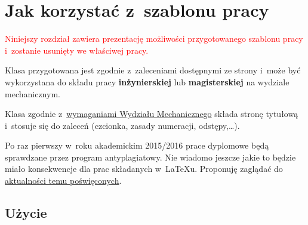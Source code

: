 
\chapter{Jak korzystać z~szablonu pracy}

\textcolor{red}{
    Niniejszy rozdział zawiera prezentację możliwości przygotowanego szablonu pracy
    i~zostanie usunięty we właściwej pracy.
}

Klasa przygotowana jest zgodnie z~zaleceniami dostępnymi ze strony \url{} i~może być wykorzystana do składu pracy \textbf{inżynierskiej} lub \textbf{magisterskiej} na wydziale mechanicznym.

Klasa zgodnie z~\href{http://www.wmech.pwr.wroc.pl/88428.dhtml}{wymaganiami Wydziału Mechanicznego} składa stronę tytułową i~stosuje się do zaleceń (czcionka, zasady numeracji, odstępy,\ldots).

Po raz pierwszy w~roku akademickim 2015/2016 prace dyplomowe będą sprawdzane przez program antyplagiatowy. Nie wiadomo jeszcze jakie to będzie miało konsekwencje dla prac składanych w~LaTeXu. Proponuję zaglądać do \href{http://kmim.wm.pwr.edu.pl/myszka/tag/antyplagiat/}{aktualności temu poświęconych}.

\section{Użycie}

